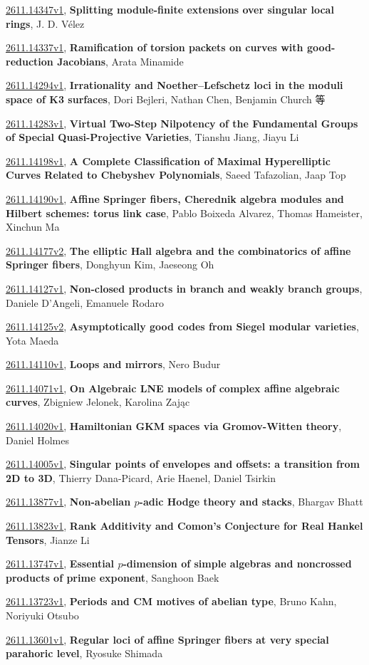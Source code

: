 \documentclass[9pt, a4paper]{article}
\theoremstyle{plain}
\theoremstyle{definition}
\theoremstyle{remark}
\newcommand{\arxiv}[3]{\href{https://arxiv.org/abs/#1}{#1}, \textbf{\textcolor{arxivblue}{#2}}, #3}
\begin{document}
\arxiv{2611.14347v1}{Splitting module-finite extensions over singular local rings}{J. D. Vélez}

\arxiv{2611.14337v1}{Ramification of torsion packets on curves with good-reduction Jacobians}{Arata Minamide}

\arxiv{2611.14294v1}{Irrationality and Noether--Lefschetz loci in the moduli space of K3 surfaces}{Dori Bejleri, Nathan Chen, Benjamin Church 等}

\arxiv{2611.14283v1}{Virtual Two-Step Nilpotency of the Fundamental Groups of Special Quasi-Projective Varieties}{Tianshu Jiang, Jiayu Li}

\arxiv{2611.14198v1}{A Complete Classification of Maximal Hyperelliptic Curves Related to Chebyshev Polynomials}{Saeed Tafazolian, Jaap Top}

\arxiv{2611.14190v1}{Affine Springer fibers, Cherednik algebra modules and Hilbert schemes: torus link case}{Pablo Boixeda Alvarez, Thomas Hameister, Xinchun Ma}

\arxiv{2611.14177v2}{The elliptic Hall algebra and the combinatorics of affine Springer fibers}{Donghyun Kim, Jaeseong Oh}

\arxiv{2611.14127v1}{Non-closed products in branch and weakly branch groups}{Daniele D'Angeli, Emanuele Rodaro}

\arxiv{2611.14125v2}{Asymptotically good codes from Siegel modular varieties}{Yota Maeda}

\arxiv{2611.14110v1}{Loops and mirrors}{Nero Budur}

\arxiv{2611.14071v1}{On Algebraic LNE models of complex affine algebraic curves}{Zbigniew Jelonek, Karolina Zając}

\arxiv{2611.14020v1}{Hamiltonian GKM spaces via Gromov-Witten theory}{Daniel Holmes}

\arxiv{2611.14005v1}{Singular points of envelopes and offsets: a transition from 2D to 3D}{Thierry Dana-Picard, Arie Haenel, Daniel Tsirkin}

\arxiv{2611.13877v1}{Non-abelian $p$-adic Hodge theory and stacks}{Bhargav Bhatt}

\arxiv{2611.13823v1}{Rank Additivity and Comon's Conjecture for Real Hankel Tensors}{Jianze Li}

\arxiv{2611.13747v1}{Essential $p$-dimension of simple algebras and noncrossed products of prime exponent}{Sanghoon Baek}

\arxiv{2611.13723v1}{Periods and CM motives of abelian type}{Bruno Kahn, Noriyuki Otsubo}

\arxiv{2611.13601v1}{Regular loci of affine Springer fibers at very special parahoric level}{Ryosuke Shimada}
\end{document}
